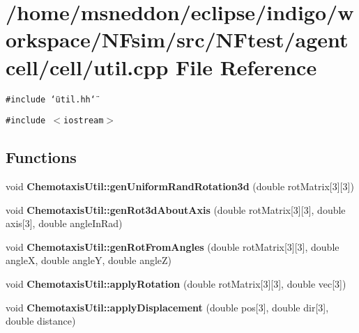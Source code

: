 \section{/home/msneddon/eclipse/indigo/workspace/NFsim/src/NFtest/agentcell/cell/util.cpp File Reference}
\label{util_8cpp}


{\tt \#include \char`\"{}util.hh\char`\"{}}\par
{\tt \#include $<$iostream$>$}\par
\subsection*{Functions}
\begin{CompactItemize}
\item 
void {\bf ChemotaxisUtil::genUniformRandRotation3d} (double rotMatrix[3][3])
\item 
void {\bf ChemotaxisUtil::genRot3dAboutAxis} (double rotMatrix[3][3], double axis[3], double angleInRad)
\item 
void {\bf ChemotaxisUtil::genRotFromAngles} (double rotMatrix[3][3], double angleX, double angleY, double angleZ)
\item 
void {\bf ChemotaxisUtil::applyRotation} (double rotMatrix[3][3], double vec[3])
\item 
void {\bf ChemotaxisUtil::applyDisplacement} (double pos[3], double dir[3], double distance)
\end{CompactItemize}
